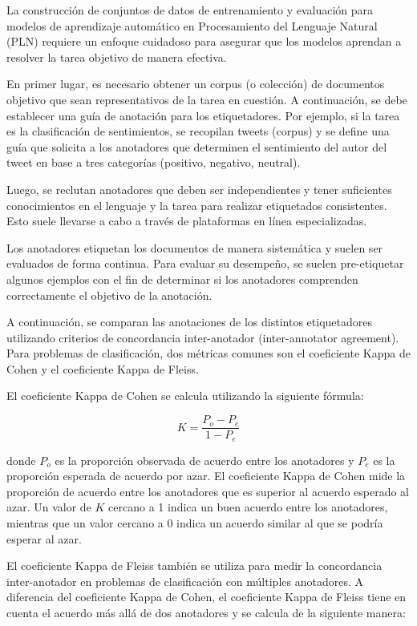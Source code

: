 La construcción de conjuntos de datos de entrenamiento y evaluación para modelos de aprendizaje automático en Procesamiento del Lenguaje Natural (PLN) requiere un enfoque cuidadoso para asegurar que los modelos aprendan a resolver la tarea objetivo de manera efectiva.

En primer lugar, es necesario obtener un corpus (o colección) de documentos objetivo que sean representativos de la tarea en cuestión. A continuación, se debe establecer una guía de anotación para los etiquetadores. Por ejemplo, si la tarea es la clasificación de sentimientos, se recopilan tweets (corpus) y se define una guía que solicita a los anotadores que determinen el sentimiento del autor del tweet en base a tres categorías (positivo, negativo, neutral).

Luego, se reclutan anotadores que deben ser independientes y tener suficientes conocimientos en el lenguaje y la tarea para realizar etiquetados consistentes. Esto suele llevarse a cabo a través de plataformas en línea especializadas.

Los anotadores etiquetan los documentos de manera sistemática y suelen ser evaluados de forma continua. Para evaluar su desempeño, se suelen pre-etiquetar algunos ejemplos con el fin de determinar si los anotadores comprenden correctamente el objetivo de la anotación.

A continuación, se comparan las anotaciones de los distintos etiquetadores utilizando criterios de concordancia inter-anotador (inter-annotator agreement). Para problemas de clasificación, dos métricas comunes son el coeficiente Kappa de Cohen y el coeficiente Kappa de Fleiss.

El coeficiente Kappa de Cohen se calcula utilizando la siguiente fórmula:

\[
K = \frac{P_o - P_e}{1 - P_e}
\]

donde \(P_o\) es la proporción observada de acuerdo entre los anotadores y \(P_e\) es la proporción esperada de acuerdo por azar. El coeficiente Kappa de Cohen mide la proporción de acuerdo entre los anotadores que es superior al acuerdo esperado al azar. Un valor de \(K\) cercano a 1 indica un buen acuerdo entre los anotadores, mientras que un valor cercano a 0 indica un acuerdo similar al que se podría esperar al azar.

El coeficiente Kappa de Fleiss también se utiliza para medir la concordancia inter-anotador en problemas de clasificación con múltiples anotadores. A diferencia del coeficiente Kappa de Cohen, el coeficiente Kappa de Fleiss tiene en cuenta el acuerdo más allá de dos anotadores y se calcula de la siguiente manera:

